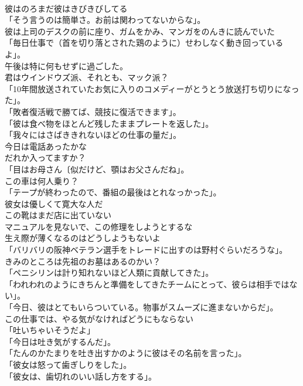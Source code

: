 \documentclass[8pt]{extreport}
\begin{document}
\begin{CJK}{UTF8}{min}
\\	彼はのろまだ彼はきびきびしてる	
\\	「そう言うのは簡単さ。お前は関わってないからな」。	
\\	彼は上司のデスクの前に座り、ガムをかみ、マンガをのんきに読んでいた	
\\	「毎日仕事で（首を切り落とされた鶏のように）せわしなく動き回っているよ」。	
\\	午後は特に何もせずに過ごした。	
\\	君はウインドウズ派、それとも、マック派？	
\\	「10年間放送されていたお気に入りのコメディーがとうとう放送打ち切りになった」。	
\\	「敗者復活戦で勝てば、競技に復活できます」。	
\\	「彼は食べ物をほとんど残したままプレートを返した」。	
\\	「我々にはさばききれないほどの仕事の量だ」。	
\\	今日は電話あったかな	
\\	だれか入ってますか？	
\\	「目はお母さん〔似だけど、顎はお父さんだね」。	
\\	この車は何人乗り？	
\\	「テープが終わったので、番組の最後はとれなっかった」。	
\\	彼女は優しくて寛大な人だ	
\\	この靴はまだ店に出ていない	
\\	マニュアルを見ないで、この修理をしようとするな	
\\	生え際が薄くなるのはどうしようもないよ	
\\	「バリバリの阪神ベテラン選手をトレードに出すのは野村ぐらいだろうな」。	
\\	きみのところは先祖のお墓はあるのかい？	
\\	「ペニシリンは計り知れないほど人類に貢献してきた」。	
\\	「われわれのようにきちんと準備をしてきたチームにとって、彼らは相手ではない」。	
\\	「今日、彼はとてもいらついている。物事がスムーズに進まないからだ」。	
\\	この仕事では、やる気がなければどうにもならない	
\\	「吐いちゃいそうだよ」	
\\	「今日は吐き気がするんだ」。	
\\	「たんのかたまりを吐き出すかのように彼はその名前を言った」。	
\\	「彼女は怒って歯ぎしりをした」。	
\\	「彼女は、歯切れのいい話し方をする」。	

\end{CJK}
\end{document}
